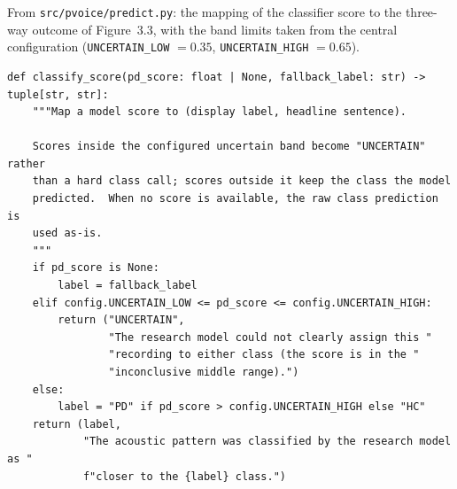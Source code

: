 From \texttt{src/pvoice/predict.py}: the mapping of the classifier
score to the three-way outcome of Figure~3.3, with the band limits
taken from the central configuration
(\texttt{UNCERTAIN\_LOW} $= 0.35$, \texttt{UNCERTAIN\_HIGH} $= 0.65$).

{\footnotesize
\begin{verbatim}
def classify_score(pd_score: float | None, fallback_label: str) -> tuple[str, str]:
    """Map a model score to (display label, headline sentence).

    Scores inside the configured uncertain band become "UNCERTAIN" rather
    than a hard class call; scores outside it keep the class the model
    predicted.  When no score is available, the raw class prediction is
    used as-is.
    """
    if pd_score is None:
        label = fallback_label
    elif config.UNCERTAIN_LOW <= pd_score <= config.UNCERTAIN_HIGH:
        return ("UNCERTAIN",
                "The research model could not clearly assign this "
                "recording to either class (the score is in the "
                "inconclusive middle range).")
    else:
        label = "PD" if pd_score > config.UNCERTAIN_HIGH else "HC"
    return (label,
            "The acoustic pattern was classified by the research model as "
            f"closer to the {label} class.")
\end{verbatim}
}

